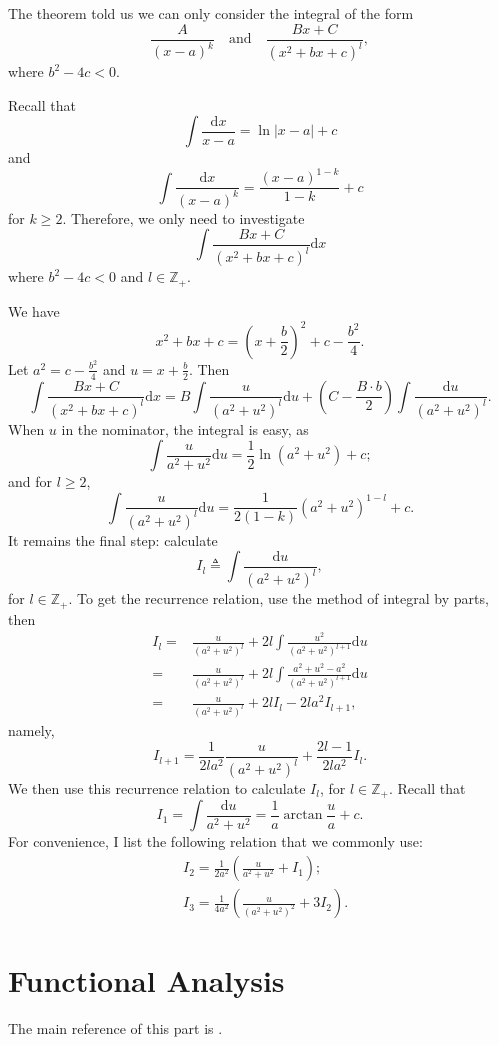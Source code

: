\documentclass[12pt,a4paper]{report}
\numberwithin{equation}{section}
\theoremstyle{mystyle}
\newcommand{\Z}{\mathbb{Z}}
\renewcommand{\d}{\mathrm{d}}
\newcommand{\abs}[1]{\left\lvert #1 \right\rvert}
\begin{document}
	The theorem told us we can only consider the integral of the form
	$$\frac{A}{(x-a)^k} \quad \text{and}\quad   \frac{Bx+C}{(x^2+bx+c)^l},$$
	where $b^2-4c<0$.
	
	Recall that $$\int \frac{\d x}{x-a} = \ln \abs{x-a}+c$$ and $$\int\frac{\d x}{(x-a)^k}=\frac{(x-a)^{1-k}}{1-k}+c$$ for $k\geq 2$. Therefore, we only need to investigate $$\int  \frac{Bx+C}{(x^2+bx+c)^l} \d x$$ where $b^2-4c<0$ and $l\in \Z_{+}$.
	
	We have 
	$$
	x^2+bx+c=(x+\frac{b}{2})^2+c-\frac{b^2}{4}.
	$$
	Let $a^2=c-\frac{b^2}{4}$ and $u=x+\frac{b}{2}$. Then
	\[
	\int  \frac{Bx+C}{(x^2+bx+c)^l} \d x = B\int \frac{u}{(a^2+u^2)^l}\d u+(C-\frac{B\cdot b}{2})\int \frac{\d u}{(a^2+u^2)^l}.
	\]
	When $u$ in the nominator, the integral is easy, as 
	$$
	\int \frac{u}{a^2+u^2}\d u=\frac{1}{2}\ln (a^2+u^2)+c;$$ and for $l\geq 2$, 
	$$
	\int \frac{u}{(a^2+u^2)^l}\d u=\frac{1}{2(1-k)}(a^2+u^2)^{1-l}+c.
	$$ It remains the final step: calculate $$I_l\triangleq \int \frac{\d u}{(a^2+u^2)^l},$$ for $l\in \Z_+$.
	To get the recurrence relation, use the method of integral by parts, then
	\begin{align*}
		I_l =& \frac{u}{(a^2+u^2)^l}+2l\int \frac{u^2}{(a^2+u^2)^{l+1}}\d u\\
		=&\frac{u}{(a^2+u^2)^l}+2l\int\frac{a^2+u^2-a^2}{(a^2+u^2)^{l+1}}\d u\\
		=& \frac{u}{(a^2+u^2)^l}+2l I_l - 2la^2 I_{l+1},
	\end{align*}
	namely,
	\begin{equation}
		I_{l+1}=\frac{1}{2la^2}\frac{u}{(a^2+u^2)^l}+\frac{2l-1}{2la^2}I_l.
	\end{equation}
	We then use this recurrence relation to calculate $I_l$, for $l\in \Z_+$. Recall that 
	$$
	I_1=\int \frac{\d u}{a^2+u^2} = \frac{1}{a}\arctan{\frac{u}{a}}+c.
	$$
	For convenience, I list the following relation that we commonly use:
	\begin{align}
		&I_2=\frac{1}{2a^2}\left(\frac{u}{a^2+u^2}+I_1\right);\\
		&I_3 = \frac{1}{4a^2}\left(\frac{u}{(a^2+u^2)^2}+3I_2\right).
	\end{align}
	
	
	
	
	
	
	\part{Functional Analysis}
	The main reference of this part is \cite{robinson_2020}.
	
\end{document}

